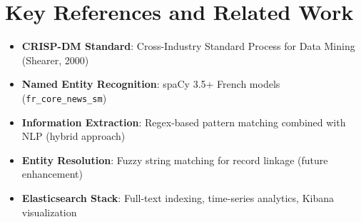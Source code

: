 \documentclass[12pt,a4paper]{report}
\begin{document}
\section{Key References and Related Work}

\begin{itemize}
    \item \textbf{CRISP-DM Standard}: Cross-Industry Standard Process for Data Mining (Shearer, 2000)
    \item \textbf{Named Entity Recognition}: spaCy 3.5+ French models (\texttt{fr\_core\_news\_sm})
    \item \textbf{Information Extraction}: Regex-based pattern matching combined with NLP (hybrid approach)
    \item \textbf{Entity Resolution}: Fuzzy string matching for record linkage (future enhancement)
    \item \textbf{Elasticsearch Stack}: Full-text indexing, time-series analytics, Kibana visualization
\end{itemize}
\end{document}
